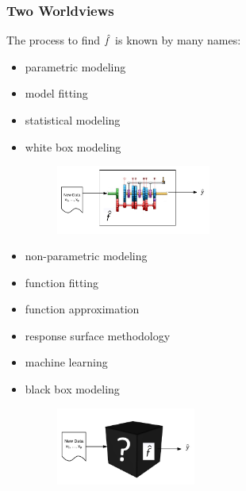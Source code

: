 \documentclass[handout]{beamer}
\begin{document}
\begin{frame}\frametitle{Two Worldviews}


The process to find $\hat{f}$ is known by many names:

\begin{minipage}{0.5\textwidth}
\begin{itemize}
\item parametric modeling
\item model fitting
\item statistical modeling
\item white box modeling
\begin{figure}
\hspace{-1cm}\includegraphics[width=2.0in]{whitebox}
\end{figure}
\end{itemize}
\end{minipage}%
\begin{minipage}{0.5\textwidth}
\begin{itemize}
\item non-parametric modeling
\item function fitting
\item function approximation
\item response surface methodology
\item machine learning
\item black box modeling
\begin{figure}
\centering
\hspace{-0.5cm}\includegraphics[width=1.8in]{blackbox}
\end{figure}
\end{itemize}
\end{minipage}

\end{frame}
\end{document}
